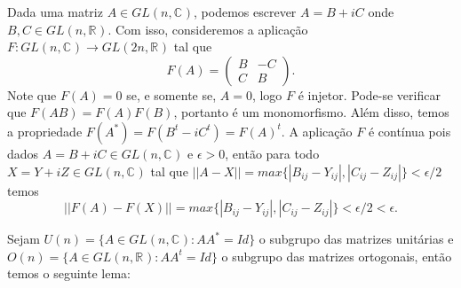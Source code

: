 \documentclass[12pt]{book}
\newcommand{\complexo}[1]{\mathbb{C}^{#1}}
\newcommand{\generalgroup}[2]{GL(#1, #2)}
\newcommand{\generalgroupreal}[1]{\generalgroup{#1}{\real{}}}
\newcommand{\generalgroupcomplexo}[1]{\generalgroup{#1}{\complexo{}}}
\newcommand{\matrizortogonal}[1]{O(#1)}
\newcommand{\matrizunitaria}[1]{U(#1)}
\newcommand{\real}[1]{\mathbb{R}^{#1}}
\begin{document}
	Dada uma matriz $A \in \generalgroupcomplexo{n}$, podemos escrever $A = B+iC$ onde $B,C \in \generalgroupreal{n}$. Com isso, consideremos a aplicação $F:\generalgroupcomplexo{n} \to \generalgroupreal{2n}$ tal que 
	$$
	F(A)=
	\left(
	\begin{array}{cc}
	B & -C
	\\
	C & B
	\end{array}
	\right).
	$$
	Note que $F(A) = 0$ se, e somente se, $A=0$, logo $F$ é injetor. Pode-se verificar que $F(AB)=F(A)F(B)$, portanto é um monomorfismo. Além disso, temos a propriedade $F(A^{*}) = F(B^{t} - iC^{t}) = F(A)^{t}$. A aplicação $F$ é contínua pois dados $A=B+iC \in \generalgroupcomplexo{n}$ e $\epsilon > 0$, então para todo $X= Y+iZ \in \generalgroupcomplexo{n}$ tal que $||A - X||=max \{|B_{ij} - Y_{ij}|,  |C_{ij} - Z_{ij}|\} < \epsilon/2$ temos
	$$
	||F(A) - F(X)|| = max \{|B_{ij} - Y_{ij}|, |C_{ij} - Z_{ij}| \}< \epsilon/2 < \epsilon.
	$$
	
	Sejam $\matrizunitaria{n} = \{A\in \generalgroupcomplexo{n}: AA^{*}=Id \}$ o subgrupo das matrizes unitárias e $\matrizortogonal{n} = \{A \in \generalgroupreal{n}: AA^{t}  =Id \}$ o subgrupo das matrizes ortogonais, então temos o seguinte lema:
	
	
	
\end{document}
